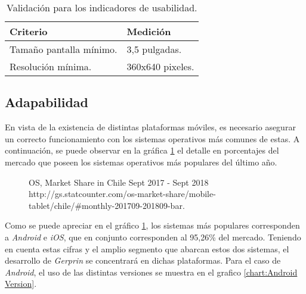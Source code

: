 \begin{table}[H]
    \caption[Validación para los indicadores de usabilidad.] {Validación para los indicadores de usabilidad.}
    \label{tbl:Criterios de Validación usabilidad}
    \begin{tabular}{|p{}|p{}|}
        \hline
        \textbf{Criterio} &  \textbf{Medición}\\
    	\hline
    	\hline
    	Tamaño pantalla mínimo. & 3,5 pulgadas. \\ \hline
		Resolución mínima.  & 360x640 pixeles. \\ 
        \hline
    \end{tabular}
\end{table}

\subsection{Adapabilidad}

En vista de la existencia de distintas plataformas móviles, es necesario asegurar un correcto funcionamiento con los sistemas operativos más comunes de estas. A continuación, se puede observar en la gráfica \ref{chart:OS} el detalle en porcentajes del mercado que poseen los sistemas operativos más populares del último año.

\begin{figure}[H]
	\centering
	\caption[OS, Market Share in Chile Sept 2017 - Sept 2018.]{OS, Market Share in Chile Sept 2017 - Sept 2018 \\ http://gs.statcounter.com/os-market-share/mobile-tablet/chile/\#monthly-201709-201809-bar.}
	\label{chart:OS}
	\begin{bchart}[step=10, max=100, width=.8\textwidth, unit=\%]
	\end{bchart}
\end{figure}

Como se puede apreciar en el gráfico \ref{chart:OS}, los sistemas más populares corresponden a \emph{Android} e \emph{iOS}, que en conjunto corresponden al 95,26\% del mercado. Teniendo en cuenta estas cifras y el amplio segmento que abarcan estos dos sistemas, el desarrollo de \emph{Gerprin} se concentrará en dichas plataformas. Para el caso de \emph{Android}, el uso de las distintas versiones se muestra en el grafico \ref{chart:Android Version}.

